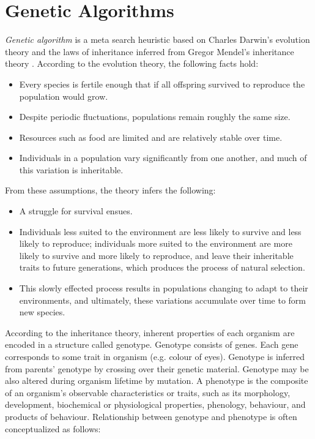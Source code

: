 \section{Genetic Algorithms}
\label{section:geneticAlgorithms}
\emph{Genetic algorithm} is a meta search heuristic based on Charles Darwin’s evolution theory \cite{Darwin} and the laws of inheritance inferred from Gregor Mendel’s inheritance theory \cite{Mendel1866}. According to the evolution theory, the following facts hold:
\begin{itemize}
	\item Every species is fertile enough that if all offspring survived to reproduce the population would grow.
	\item Despite periodic fluctuations, populations remain roughly the same size.
	\item Resources such as food are limited and are relatively stable over time.
	\item Individuals in a population vary significantly from one another, and much of this variation is inheritable.
\end{itemize}
From these assumptions, the theory infers the following:
\begin{itemize}
	\item A struggle for survival ensues.
	\item Individuals less suited to the environment are less likely to survive and less likely to reproduce; individuals more suited to the environment are more likely to survive and more likely to reproduce, and leave their inheritable traits to future generations, which produces the process of natural selection.
	\item This slowly effected process results in populations changing to adapt to their environments, and ultimately, these variations accumulate over time to form new species.
\end{itemize}
According to the inheritance theory, inherent properties of each organism are encoded in a structure called genotype. Genotype consists of genes. Each gene corresponds to some trait in organism (e.g. colour of eyes). Genotype is inferred from parents’ genotype by crossing over their genetic material. Genotype may be also altered during organism lifetime by mutation. A phenotype is the composite of an organism's observable characteristics or traits, such as its morphology, development, biochemical or physiological properties, phenology, behaviour, and products of behaviour. Relationship between genotype and phenotype is often conceptualized as follows:

